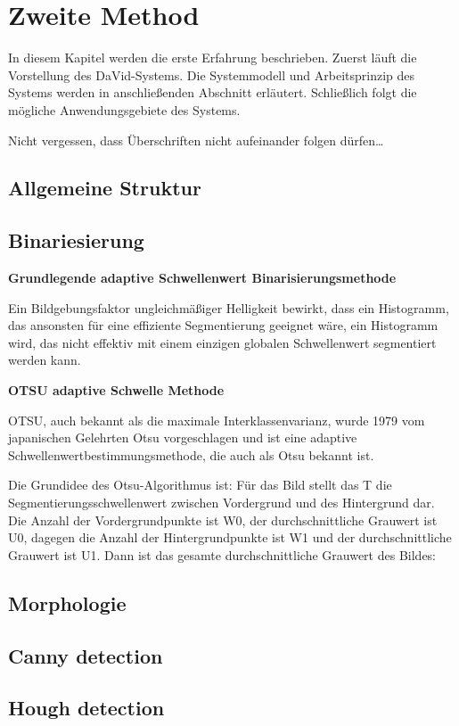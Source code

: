 \chapter{Zweite Method} \label{cha:ZweiteMethod}

In diesem Kapitel werden die erste Erfahrung beschrieben. Zuerst läuft die Vorstellung des DaVid-Systems. Die Systemmodell und Arbeitsprinzip des Systems werden in anschließenden Abschnitt erläutert. Schließlich folgt die mögliche Anwendungsgebiete des Systems.

Nicht vergessen, dass Überschriften nicht aufeinander folgen dürfen\ldots

\section{Allgemeine Struktur}


\section{Binariesierung}

\textbf{Grundlegende adaptive Schwellenwert Binarisierungsmethode}

Ein Bildgebungsfaktor ungleichmäßiger Helligkeit bewirkt, dass ein Histogramm, das ansonsten für eine effiziente Segmentierung geeignet wäre, ein Histogramm wird, das nicht effektiv mit einem einzigen globalen Schwellenwert segmentiert werden kann.


\textbf{OTSU adaptive Schwelle Methode}

OTSU, auch bekannt als die maximale Interklassenvarianz, wurde 1979 vom japanischen Gelehrten Otsu vorgeschlagen und ist eine adaptive Schwellenwertbestimmungsmethode, die auch als Otsu bekannt ist.

Die Grundidee des Otsu-Algorithmus ist: Für das Bild stellt das T die Segmentierungsschwellenwert zwischen Vordergrund und des Hintergrund dar. Die Anzahl der Vordergrundpunkte ist W0, der durchschnittliche Grauwert ist U0, dagegen die Anzahl der Hintergrundpunkte ist W1 und der durchschnittliche Grauwert ist U1. Dann ist das gesamte durchschnittliche Grauwert des Bildes:




















\section{Morphologie}



\section{Canny detection}



\section{Hough detection}


